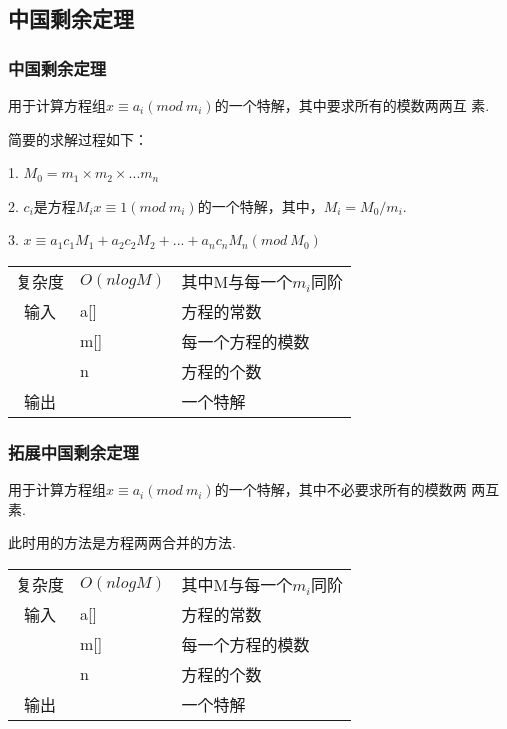     \subsection{中国剩余定理}\small


        \subsubsection{中国剩余定理}\small
用于计算方程组$x \equiv a_i(mod\ m_i)$的一个特解，其中要求所有的模数两两互
素.

简要的求解过程如下：

1. $M_0 = m_1 \times m_2 \times ... m_n$

2. $c_i$是方程$M_ix \equiv 1(mod\ m_i)$的一个特解，其中，$M_i = M_0 / m_i$.

3. $x \equiv a_1c_1M_1 + a_2c_2M_2 + ... + a_nc_nM_n (mod\ M_0)$

\begin{longtable}{|c|l|l|}
复杂度 & $O(nlogM)$ & 其中M与每一个$m_i$同阶 \\
输入 & a[] & 方程的常数 \\
 & m[] & 每一个方程的模数 \\
 & n & 方程的个数 \\
输出 & & 一个特解 \\
\end{longtable}



        \subsubsection{拓展中国剩余定理}\small
用于计算方程组$x \equiv a_i(mod\ m_i)$的一个特解，其中不必要求所有的模数两
两互素.

此时用的方法是方程两两合并的方法.
\begin{longtable}{|c|l|l|}
复杂度 & $O(nlogM)$ & 其中M与每一个$m_i$同阶 \\
输入 & a[] & 方程的常数 \\
 & m[] & 每一个方程的模数 \\
 & n & 方程的个数 \\
输出 & & 一个特解 \\
\end{longtable}




